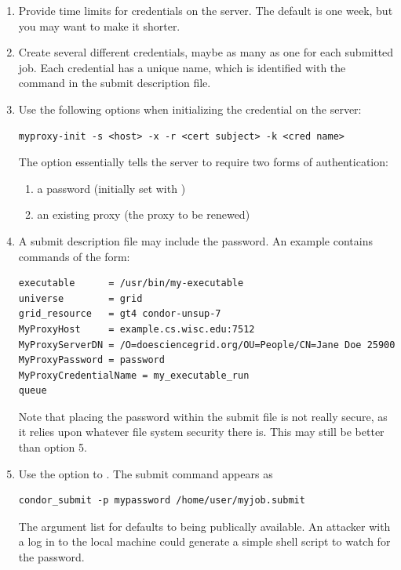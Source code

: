 \begin{enumerate}

\item{Provide time limits}
for credentials on the  server.
The default is one week, but you may want to make it shorter.

\item{Create several different  credentials},
maybe as many as one for each submitted job.
Each credential has a unique name,
which is identified with the
 command in the submit description file.

\item{Use the following options}
when initializing the credential on the  server:

\footnotesize
\begin{verbatim}
myproxy-init -s <host> -x -r <cert subject> -k <cred name>
\end{verbatim}
\normalsize

The option 
essentially tells the  server to require two forms
of authentication:
  \begin{enumerate}
  \item{a password (initially set with )}
  \item{an existing proxy (the proxy to be renewed)}
  \end{enumerate}

\item{A submit description file may include the password.}
An example contains commands of the form:
\footnotesize
\begin{verbatim}
executable      = /usr/bin/my-executable
universe        = grid
grid_resource   = gt4 condor-unsup-7
MyProxyHost     = example.cs.wisc.edu:7512
MyProxyServerDN = /O=doesciencegrid.org/OU=People/CN=Jane Doe 25900
MyProxyPassword = password
MyProxyCredentialName = my_executable_run
queue
\end{verbatim}
\normalsize
Note that placing the password within the submit file
is not really secure,
as it relies upon whatever file system security there is.
This may still be better than option 5.

\item{Use the  option to .}
The submit command appears as
\footnotesize
\begin{verbatim}
condor_submit -p mypassword /home/user/myjob.submit
\end{verbatim}
\normalsize
The argument list for  defaults to
being publically available.
An attacker with a log in to the local machine could
generate a simple shell script
to watch for the password. 

\end{enumerate}

